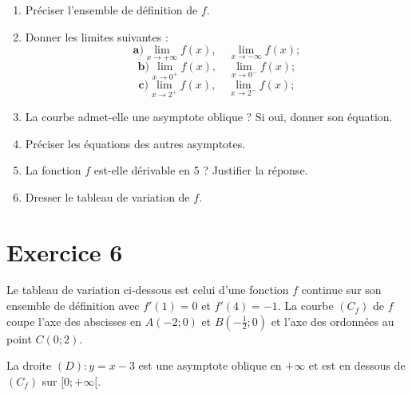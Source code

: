 \documentclass[12pt,a4paper]{article}
\begin{document}
\begin{enumerate}
    \item Préciser l'ensemble de définition de $f$.
    \item Donner les limites suivantes :
    \[
    \textbf{a)} \lim_{x \to +\infty} f(x), \quad \lim_{x \to -\infty} f(x) ;
    \]
    \[
    \textbf{b)} \lim_{x \to 0^+} f(x), \quad \lim_{x \to 0^-} f(x) ;
    \]
    \[
    \textbf{c)} \lim_{x \to 2^+} f(x), \quad \lim_{x \to 2^-} f(x) ;
    \]
    \item La courbe admet-elle une asymptote oblique ? Si oui, donner son équation.
    \item Préciser les équations des autres asymptotes.
    \item La fonction $f$ est-elle dérivable en 5 ? Justifier la réponse.
    \item Dresser le tableau de variation de $f$.
\end{enumerate}

\section*{Exercice 6}

Le tableau de variation ci-dessous est celui d'une fonction $f$ continue sur son ensemble de définition avec $f'(1) = 0$ et $f'(4) = -1$. La courbe $(C_f)$ de $f$ coupe l'axe des abscisses en $A(-2;0)$ et $B\left(-\frac{1}{2};0\right)$ et l'axe des ordonnées au point $C(0;2)$.

La droite $(D) : y = x - 3$ est une asymptote oblique en $+\infty$ et est en dessous de $(C_f)$ sur $[0; +\infty[$.

\end{document}
